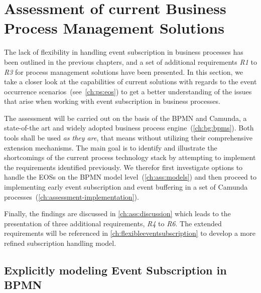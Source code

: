 \chapter{Assessment of current Business Process Management Solutions}\label{ch:assessment}

The lack of flexibility in handling event subscription in business processes has been outlined in the previous chapters, and a set of additional requirements \textit{R1} to \textit{R3} for process management solutions have been presented.
In this section, we take a closer look at the capabilities of current solutions with regards to the event occurrence scenarios~(see~\autoref{ch:ps:eos}) to get a better understanding of the issues that arise when working with event subscription in business processes.

The assessment will be carried out on the basis of the \ac{BPMN} and Camunda, a state-of-the art and widely adopted business process engine~(\autoref{ch:bg:bpms}). Both tools shall be used \textit{as they are}, that means without utilizing their comprehensive extension mechanisms.
The main goal is to identify and illustrate the shortcomings of the current process technology stack by attempting to implement the requirements identified previously.
We therefor first investigate options to handle the \acs{EOS}s on the BPMN model level~(\autoref{ch:ass:models}) and then proceed to implementing early event subscription and event buffering in a set of Camunda processes~(\autoref{ch:assessment-implementation}).

Finally, the findings are discussed in \autoref{ch:ass:discussion} which leads to the presentation of three additional requirements, \textit{R4} to \textit{R6}.
The extended requirements will be referenced in \autoref{ch:flexibleeventsubscription} to develop a more refined subscription handling model.


\section{Explicitly modeling Event Subscription in BPMN}


